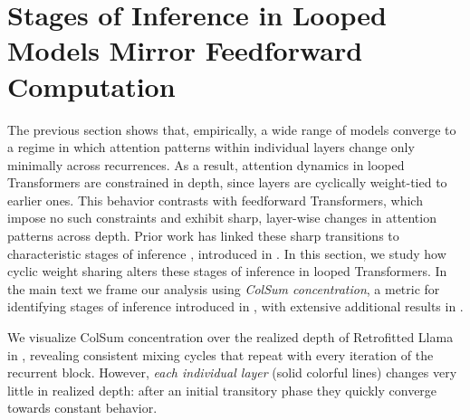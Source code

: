 \documentclass{article}
\theoremstyle{plain}
\theoremstyle{definition}
\theoremstyle{remark}
\begin{document}
\section{Stages of Inference in Looped Models Mirror Feedforward Computation}\label{sec:stages_of_inference}
The previous section shows that, empirically, a wide range of models converge to a regime in which attention patterns within individual layers change only minimally across recurrences. As a result, attention dynamics in looped Transformers are constrained in depth, since layers are cyclically weight-tied to earlier ones. This behavior contrasts with feedforward Transformers, which impose no such constraints and exhibit sharp, layer-wise changes in attention patterns across depth. Prior work has linked these sharp transitions to characteristic stages of inference \citep{lad2024remarkable,queipo2025attention}, introduced in . In this section, we study how cyclic weight sharing alters these stages of inference in looped Transformers. In the main text we frame our analysis using \emph{ColSum concentration}, a metric for identifying stages of inference introduced in , with extensive additional results in .


We visualize ColSum concentration over the realized depth of Retrofitted Llama in , revealing consistent mixing cycles that repeat with every iteration of the recurrent block. However, \emph{each individual layer} (solid colorful lines) changes very little in realized depth: after an initial transitory phase they quickly converge towards constant behavior.
\end{document}
